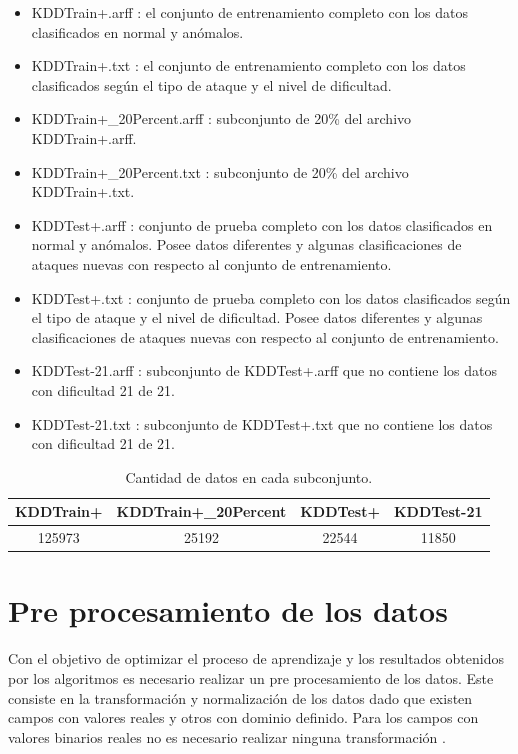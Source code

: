 \begin{itemize}
    \item KDDTrain+.arff : el conjunto de entrenamiento completo con los datos clasificados en normal y anómalos.
    \item KDDTrain+.txt : el conjunto de entrenamiento completo con los datos clasificados según el tipo de ataque y el nivel de dificultad.
    \item KDDTrain+\_20Percent.arff : subconjunto de 20\% del archivo KDDTrain+.arff.
    \item KDDTrain+\_20Percent.txt : subconjunto de 20\% del archivo KDDTrain+.txt.
    \item KDDTest+.arff : conjunto de prueba completo con los datos clasificados en normal y anómalos. Posee datos diferentes y algunas clasificaciones de ataques nuevas con respecto al conjunto de entrenamiento.
    \item KDDTest+.txt : conjunto de prueba completo con los datos clasificados según el tipo de ataque y el nivel de dificultad. Posee datos diferentes y algunas clasificaciones de ataques nuevas con respecto al conjunto de entrenamiento.
    \item KDDTest-21.arff : subconjunto de KDDTest+.arff que no contiene los datos con dificultad 21 de 21.
    \item KDDTest-21.txt : subconjunto de KDDTest+.txt que no contiene los datos con dificultad 21 de 21.
\end{itemize}

\begin{table}[h!t]
    \begin{center}
        \label{tab:len_datasets}
        \begin{tabular}{c|c|c|c} %
            \textbf{KDDTrain+} & \textbf{KDDTrain+\_20Percent} & \textbf{KDDTest+} & \textbf{KDDTest-21}\\
            \hline
            125973 & 25192 & 22544 & 11850\\
        \end{tabular}

        \caption{Cantidad de datos en cada subconjunto.}
    \end{center}
\end{table}

\section{Pre procesamiento de los datos}
Con el objetivo de optimizar el proceso de aprendizaje y los resultados obtenidos por los algoritmos es necesario realizar un pre procesamiento de los datos. Este consiste en la transformación y normalización de los datos dado que existen campos con valores reales y otros con dominio definido. Para los campos con valores binarios reales no es necesario realizar ninguna transformación \cite{patro2015normalization}.

